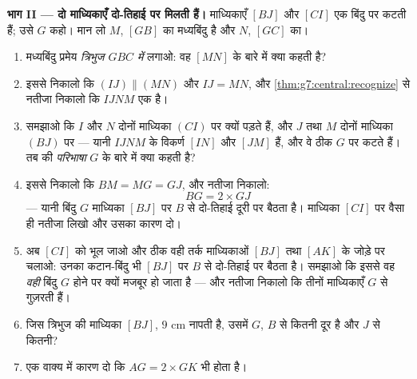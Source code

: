 \begin{problem}[{सप्ताहांत समस्या --- किसी त्रिभुज की माध्यिकाएँ एक
ही बिंदु पर मिलती हैं, हर एक के दो-तिहाई पर}]
\medskip
\noindent\textbf{भाग II --- दो माध्यिकाएँ दो-तिहाई पर मिलती
हैं।}
माध्यिकाएँ $[BJ]$ और $[CI]$ एक बिंदु पर कटती हैं; उसे $G$ कहो। मान
लो $M$, $[GB]$ का मध्यबिंदु है और $N$, $[GC]$ का।
\begin{enumerate}[resume]
  \item मध्यबिंदु प्रमेय \emph{त्रिभुज $GBC$ में} लगाओ: वह 
        $[MN]$ के बारे में क्या कहती है?
  \item इससे निकालो कि $(IJ) \parallel (MN)$ और $IJ = MN$, और
        \cref{thm:g7:central:recognize} से नतीजा निकालो कि $IJNM$
        एक  है।
  \item समझाओ कि $I$ और $N$ दोनों माध्यिका $(CI)$ पर क्यों पड़ते
        हैं, और $J$ तथा $M$ दोनों माध्यिका $(BJ)$ पर --- यानी
         $IJNM$ के विकर्ण $[IN]$ और $[JM]$ हैं, और
        वे ठीक $G$ पर कटते हैं। तब  की
        \emph{परिभाषा} $G$ के बारे में क्या कहती है?
  \item इससे निकालो कि $BM = MG = GJ$, और नतीजा निकालो:
        \[
        BG = 2 \times GJ
        \]
        --- यानी बिंदु $G$ माध्यिका $[BJ]$ पर  $B$ से
        दो-तिहाई दूरी पर बैठता है। माध्यिका $[CI]$ पर वैसा ही
        नतीजा लिखो और उसका कारण दो।
  \item अब $[CI]$ को भूल जाओ और ठीक वही तर्क माध्यिकाओं $[BJ]$
        तथा $[AK]$ के जोड़े पर चलाओ: उनका कटान-बिंदु भी $[BJ]$ पर
        $B$ से दो-तिहाई पर बैठता है। समझाओ कि इससे वह \emph{वही}
        बिंदु $G$ होने पर क्यों मजबूर हो जाता है --- और नतीजा
        निकालो कि तीनों माध्यिकाएँ $G$ से गुज़रती हैं।
  \item जिस त्रिभुज की माध्यिका $[BJ]$, $9$ cm नापती है, उसमें
        $G$, $B$ से कितनी दूर है और $J$ से कितनी?
  \item एक वाक्य में कारण दो कि $AG = 2 \times GK$ भी होता है।
\end{enumerate}


\end{problem}
